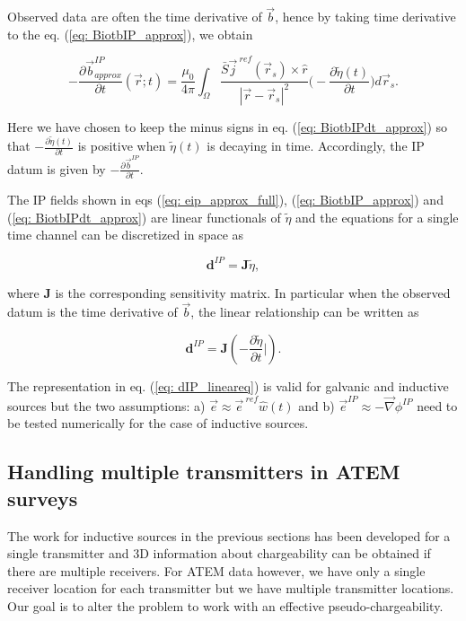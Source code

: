 \documentclass[letterpaper,11pt]{article}
\newcommand{\grad}{\vec \nabla}
\renewcommand {\j}  { {\vec j} }
\renewcommand {\b}  { {\vec b} }
\newcommand {\e}  { {\vec e} }
\newcommand{\peta}{\tilde{\eta}}
\newcommand{\eref}{\e^{\ ref}}
\newcommand{\jref}{\j^{\ ref}}
\begin{document}
Observed data are often the time derivative of $\b$, hence by taking time derivative to the eq. (\ref{eq: BiotbIP_approx}), we obtain
\begin{linenomath*}
\begin{equation}
  -\frac{\partial\b^{IP}_{approx}}{\partial t}(\vec{r}; t) = \frac{\mu_0}{4\pi} \int_{\Omega}  \frac{\bar{S}\jref(\vec{r}_s)\times\hat{r}}{|\vec{r}-\vec{r}_s|^2} \Big( -\frac{\partial \peta(t)}{\partial t} \Big) d\vec{r}_s.
  \label{eq: BiotbIPdt_approx}
\end{equation}
\end{linenomath*}
Here we have chosen to keep the minus signs in eq. (\ref{eq: BiotbIPdt_approx}) so that $-\frac{\partial \peta(t)}{\partial t}$ is positive when $\peta(t)$ is decaying in time. 
Accordingly, the IP datum is given by  $-\frac{\partial\b^{IP}}{\partial t}$. 

The IP fields shown in eqs (\ref{eq: eip_approx_full}), (\ref{eq: BiotbIP_approx}) and (\ref{eq: BiotbIPdt_approx}) are linear functionals of $\peta$ and the equations for a single time channel can be discretized in space as
\begin{linenomath*}
\begin{equation}
  \mathbf{d}^{IP} = \mathbf{J}\peta,
  \label{eq: dIP_lineareq}
\end{equation}
\end{linenomath*}
where $\mathbf{J}$ is the corresponding sensitivity matrix. 
In particular when the observed datum is the time derivative of $\b$, the linear relationship can be written as 
\begin{linenomath*}
\begin{equation}
  \mathbf{d}^{IP} = \mathbf{J}(-\frac{\partial \peta}{\partial t}\Big|).
  \label{eq: dIP_lineareq_dbdt}
\end{equation}
\end{linenomath*}
The representation in eq. (\ref{eq: dIP_lineareq}) is valid for galvanic and inductive sources but the two assumptions: a) $\e \approx \eref \hat{w}(t)$ and b) $\e^{IP} \approx -\grad\phi^{IP}$ need to be tested numerically for the case of inductive sources. 

\subsection{Handling multiple transmitters in ATEM surveys}
\label{subsection: Handling multiple transmitters in ATEM surveys}
The work for inductive sources in the previous sections has been developed for a single transmitter and 3D information about chargeability can be obtained if there are multiple receivers. For ATEM data however, we have only a single receiver location for each transmitter but we have multiple transmitter locations. 
Our goal is to alter the problem to work with an effective pseudo-chargeability. 
\end{document}
